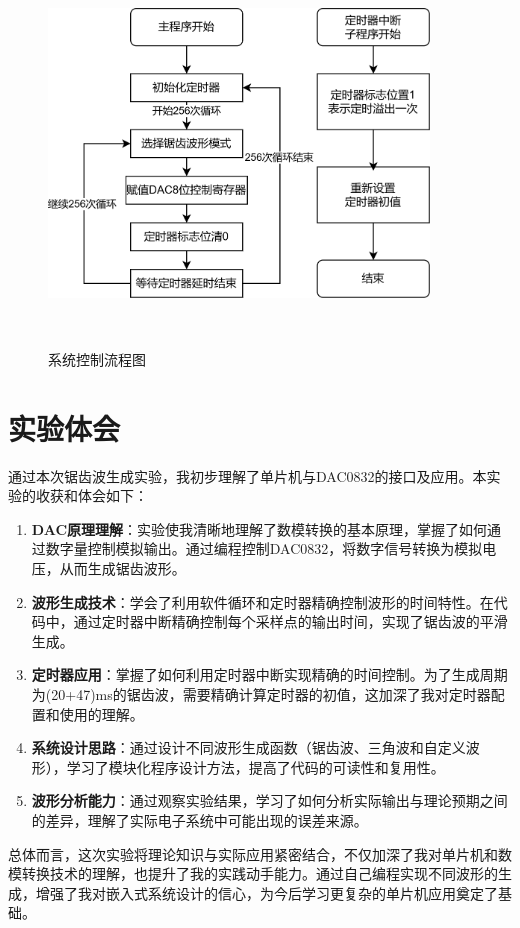 \documentclass[12pt,hyperref,a4paper,UTF8]{ctexart}
\begin{document}
\begin{figure}[H] %
        \centering
        \includegraphics[width=0.9\textwidth]{figures/301.png} %
        \caption{系统控制流程图} %
        \label{fig:example} %
\end{figure}



\section{实验体会}

通过本次锯齿波生成实验，我初步理解了单片机与DAC0832的接口及应用。本实验的收获和体会如下：

\begin{enumerate}
    \item \textbf{DAC原理理解}：实验使我清晰地理解了数模转换的基本原理，掌握了如何通过数字量控制模拟输出。通过编程控制DAC0832，将数字信号转换为模拟电压，从而生成锯齿波形。
    
    \item \textbf{波形生成技术}：学会了利用软件循环和定时器精确控制波形的时间特性。在代码中，通过定时器中断精确控制每个采样点的输出时间，实现了锯齿波的平滑生成。
    
    \item \textbf{定时器应用}：掌握了如何利用定时器中断实现精确的时间控制。为了生成周期为(20+47)ms的锯齿波，需要精确计算定时器的初值，这加深了我对定时器配置和使用的理解。
    
    \item \textbf{系统设计思路}：通过设计不同波形生成函数（锯齿波、三角波和自定义波形），学习了模块化程序设计方法，提高了代码的可读性和复用性。
    
    \item \textbf{波形分析能力}：通过观察实验结果，学习了如何分析实际输出与理论预期之间的差异，理解了实际电子系统中可能出现的误差来源。
    
\end{enumerate}

总体而言，这次实验将理论知识与实际应用紧密结合，不仅加深了我对单片机和数模转换技术的理解，也提升了我的实践动手能力。通过自己编程实现不同波形的生成，增强了我对嵌入式系统设计的信心，为今后学习更复杂的单片机应用奠定了基础。
\end{document}
